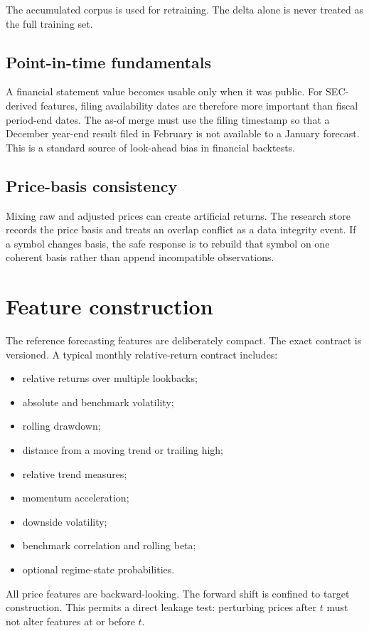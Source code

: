 \documentclass[11pt]{article}
\begin{document}
The accumulated corpus is used for retraining. The delta alone is never treated as the full training set.

\subsection{Point-in-time fundamentals}
A financial statement value becomes usable only when it was public. For SEC-derived features, filing availability dates are therefore more important than fiscal period-end dates. The as-of merge must use the filing timestamp so that a December year-end result filed in February is not available to a January forecast. This is a standard source of look-ahead bias in financial backtests.

\subsection{Price-basis consistency}
Mixing raw and adjusted prices can create artificial returns. The research store records the price basis and treats an overlap conflict as a data integrity event. If a symbol changes basis, the safe response is to rebuild that symbol on one coherent basis rather than append incompatible observations.

\section{Feature construction}
The reference forecasting features are deliberately compact. The exact contract is versioned. A typical monthly relative-return contract includes:
\begin{itemize}[itemsep=0.15em]
\item relative returns over multiple lookbacks;
\item absolute and benchmark volatility;
\item rolling drawdown;
\item distance from a moving trend or trailing high;
\item relative trend measures;
\item momentum acceleration;
\item downside volatility;
\item benchmark correlation and rolling beta;
\item optional regime-state probabilities.
\end{itemize}

All price features are backward-looking. The forward shift is confined to target construction. This permits a direct leakage test: perturbing prices after $t$ must not alter features at or before $t$.
\end{document}
